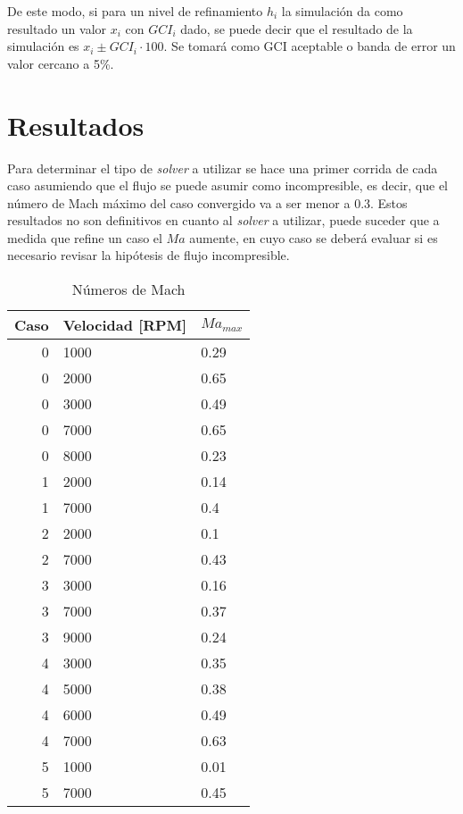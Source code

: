 De este modo, si para un nivel de refinamiento $h_i$ la simulación da como
resultado un valor $x_i$ con $GCI_i$ dado, se puede decir que el resultado
de la simulación es $x_i \pm GCI_i \cdot 100$.
%
Se tomará como GCI aceptable o banda de error un valor cercano a 5\%.

\section{Resultados}

Para determinar el tipo de \emph{solver} a utilizar se hace una primer corrida
de cada caso asumiendo que el flujo se puede asumir como incompresible, es
decir, que el número de Mach máximo del caso convergido va a ser menor a 0.3.
%
Estos resultados no son definitivos en cuanto al \emph{solver} a utilizar,
puede suceder que a medida que refine un caso el $Ma$ aumente, en cuyo caso
se deberá evaluar si es necesario revisar la hipótesis de flujo incompresible.


\begin{table}
    \centering
    \begin{tabular}{rll}\toprule
        Caso & Velocidad [RPM] & $Ma_{max}$ \\ \midrule
        0 & 1000 & 0.29 \\
        0 & 2000 & 0.65 \\
        0 & 3000 & 0.49 \\
        0 & 7000 & 0.65 \\
        0 & 8000 & 0.23 \\
        1 & 2000 & 0.14 \\
        1 & 7000 & 0.4 \\
        2 & 2000 & 0.1 \\
        2 & 7000 & 0.43 \\
        3 & 3000 & 0.16 \\
        3 & 7000 & 0.37 \\
        3 & 9000 & 0.24 \\
        4 & 3000 & 0.35 \\
        4 & 5000 & 0.38 \\
        4 & 6000 & 0.49 \\
        4 & 7000 & 0.63 \\
        5 & 1000 & 0.01 \\
        5 & 7000 & 0.45 \\ \bottomrule
    \end{tabular}
    \caption{Números de Mach}
    \label{tab:mach}
\end{table}

